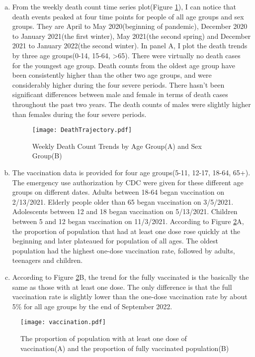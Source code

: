\documentclass[12pt]{article}
\begin{document}
\begin{enumerate}[(a)]
	\item From the weekly death count time series plot(Figure \ref{weekdeath}), I can notice that death events peaked at four time points for people of all age groups and sex groups. They are April to May 2020(beginning of pandemic), December 2020 to January 2021(the first winter), May 2021(the second spring) and December 2021 to January 2022(the second winter). In panel A, I plot the death trends by three age groups(0-14, 15-64, >65). There were virtually no death cases for the youngest age group. Death counts from the oldest age group have been consistently higher than the other two age groups, and were considerably higher during the four severe periods. There hasn't been significant differences between male and female in terms of death cases throughout the past two years. The death counts of males were slightly higher than females during the four severe periods.
	\begin{figure}[htbp]
		\centering
		\texttt{[image: DeathTrajectory.pdf]}
		\caption{Weekly Death Count Trends by Age Group(A) and Sex Group(B)}\label{weekdeath}
	\end{figure} 
	
	\item The vaccination data is provided for four age groups(5-11, 12-17, 18-64, 65+). The emergency use authorization by CDC were given for these different age groups on different dates. Adults between 18-64 began vaccination on 2/13/2021. Elderly people older than 65 began vaccination on 3/5/2021. Adolescents between 12 and 18 began vaccination on 5/13/2021. Children between 5 and 12 began vaccination on 11/3/2021. According to Figure \ref{vaccinationplot}A, the proportion of population that had at least one dose rose quickly at the beginning and later plateaued for population of all ages. The oldest population had the highest one-dose vaccination rate, followed by adults, teenagers and children.
	
	\item According to Figure \ref{vaccinationplot}B, the trend for the fully vaccinated is the basically the same as those with at least one dose. The only difference is that the full vaccination rate is slightly lower than the one-dose vaccination rate by about 5\% for all age groups by the end of September 2022.
\end{enumerate}

	\begin{figure}[htbp]
		\centering
		\texttt{[image: vaccination.pdf]}
		\caption{The proportion of population with at least one dose of vaccination(A) and the proportion of fully vaccinated population(B)}\label{vaccinationplot}
	\end{figure}
	
\end{document}
